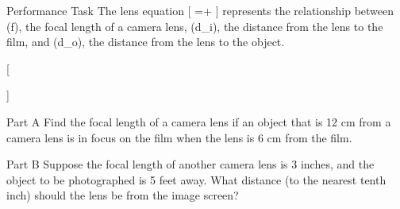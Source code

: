 \documentclass{article}
\newenvironment{practice}[2]{}{}
\newcommand{\answer}[1]{}
\newcommand{\uncertain}[2]{#1}
\begin{document}
\begin{practice}{36}{\uncertain{3}{not listed in Item Analysis table}}
Performance Task The lens equation
[
=+
]
represents the relationship between (f), the focal length of a camera lens, (d_i), the distance from the lens to the film, and (d_o), the distance from the lens to the object.

[
]

Part A Find the focal length of a camera lens if an object that is 12 cm from a camera lens is in focus on the film when the lens is 6 cm from the film.

Part B Suppose the focal length of another camera lens is 3 inches, and the object to be photographed is 5 feet away. What distance (to the nearest tenth inch) should the lens be from the image screen?

\answer{Part A (f=4) cm. Part B (x\approx 3.2) inches.}
\end{practice}
\end{document}
